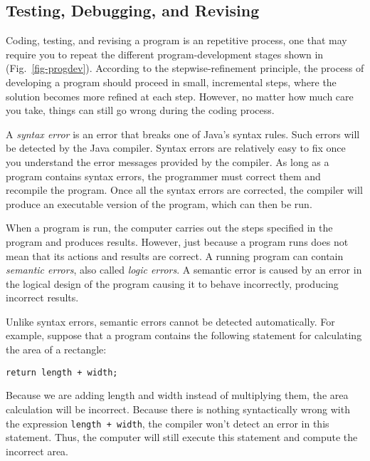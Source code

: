 \subsection{Testing, Debugging, and Revising}

\noindent Coding, testing, and revising a program is an 
repetitive process, one that may require you to repeat the different
program-development stages shown in (Fig.~\ref{fig-progdev}).
According to the stepwise-refinement principle, the process of
developing a program should proceed in small, incremental steps, where
the solution becomes more refined at each step.  However, no matter
how much care you take, things can still go wrong during the coding
process.

A {\it syntax error} is an error that breaks one of Java's syntax
rules. Such errors will be detected by the Java compiler.  Syntax errors 
are relatively easy to fix once you understand the error messages
provided by the compiler.  As long as a program contains syntax
errors, the programmer must correct them and recompile the program.
Once all the syntax errors are corrected, the compiler will produce an
executable version of the program, which can then be run.

When a program is run, the computer carries out the steps specified in
the program and produces results.  However, just because a program
runs does not mean that its actions and results are correct.  A
running program can contain {\it semantic errors}, also called 
{\it logic errors}.  A semantic error is caused by an error in the
logical design of the program causing it to behave incorrectly,
producing incorrect results.

Unlike syntax errors, semantic errors cannot be detected
automatically.   For example, suppose that a program contains the
following statement for calculating the area of a rectangle:


\begin{jjjlisting}
\begin{lstlisting}
return length + width;
\end{lstlisting}
\end{jjjlisting}

\noindent Because we are adding length and width instead of
multiplying them, the area calculation will be incorrect.  Because
there is nothing syntactically wrong with the expression {\tt length +
width}, the compiler won't detect an error in this statement.  Thus,
the computer will still execute this statement and compute the
incorrect area. 

